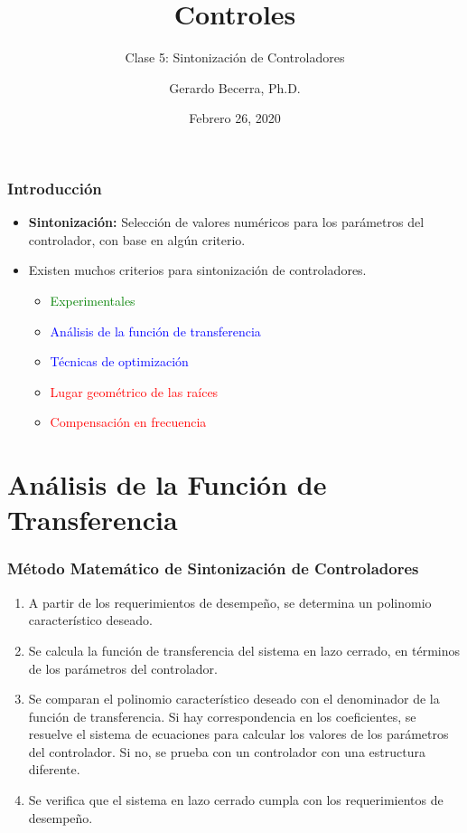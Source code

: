\documentclass[aspectratio=169]{beamer}
\title{Controles}
\subtitle{\small Clase 5: Sintonización de Controladores}
\author{Gerardo Becerra, Ph.D.}
\institute{Pontificia Universidad Javeriana\\ Departamento de Electrónica}
\date{Febrero 26, 2020}
\theoremstyle{definition}
\theoremstyle{plain}
\theoremstyle{remark}
\begin{document}
\frame{\titlepage}	


\begin{frame}[<+->]\frametitle{Introducción}
\vspace*{5mm}
\centering
\begin{itemize}
	\item \textbf{Sintonización:} Selección de valores numéricos para los parámetros del controlador, con base en algún criterio.
	\item Existen muchos criterios para sintonización de controladores.
	\begin{itemize}
		\item \textcolor{green}{Experimentales}
		\item \textcolor{blue}{Análisis de la función de transferencia}
		\item \textcolor{blue}{Técnicas de optimización}
		\item \textcolor{red}{Lugar geométrico de las raíces}
		\item \textcolor{red}{Compensación en frecuencia}
	\end{itemize}
\end{itemize}
\end{frame}

\section{Análisis de la Función de Transferencia}
\begin{frame}[<+->]\frametitle{Método Matemático de Sintonización de Controladores}
\begin{enumerate}
	\item A partir de los requerimientos de desempeño, se determina un polinomio característico deseado.
	\item Se calcula la función de transferencia del sistema en lazo cerrado, en términos de los parámetros del controlador.
	\item Se comparan el polinomio característico deseado con el denominador de la función de transferencia. Si hay correspondencia en los coeficientes, se resuelve el sistema de ecuaciones para calcular los valores de los parámetros del controlador. Si no, se prueba con un controlador con una estructura diferente.
	\item Se verifica que el sistema en lazo cerrado cumpla con los requerimientos de desempeño.
\end{enumerate}
\end{frame}
\end{document}
